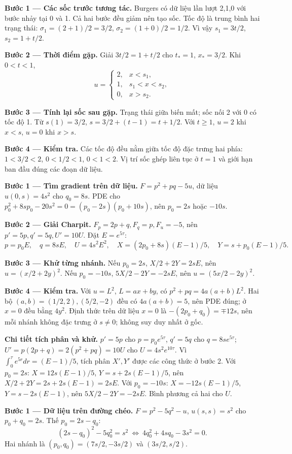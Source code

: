 \textbf{Bước 1 — Các sốc trước tương tác.} Burgers có dữ liệu lần lượt 2,1,0 với bước nhảy tại 0 và 1. Cả hai bước đều giảm nên tạo sốc. Tốc độ là trung bình hai trạng thái: $\sigma_1=(2+1)/2=3/2$, $\sigma_2=(1+0)/2=1/2$. Vì vậy $s_1=3t/2$, $s_2=1+t/2$.

\textbf{Bước 2 — Thời điểm gặp.} Giải $3t/2=1+t/2$ cho $t_*=1$, $x_*=3/2$. Khi $0<t<1$,
\[u=\begin{cases}2,&x<s_1,\\1,&s_1<x<s_2,\\0,&x>s_2.\end{cases}\]

\textbf{Bước 3 — Tính lại sốc sau gặp.} Trạng thái giữa biến mất; sốc nối 2 với 0 có tốc độ 1. Từ $s(1)=3/2$, $s=3/2+(t-1)=t+1/2$. Với $t\ge1$, $u=2$ khi $x<s$, $u=0$ khi $x>s$.

\textbf{Bước 4 — Kiểm tra.} Các tốc độ đều nằm giữa tốc độ đặc trưng hai phía: $1<3/2<2$, $0<1/2<1$, $0<1<2$. Vị trí sốc ghép liên tục ở $t=1$ và giới hạn ban đầu đúng các đoạn dữ liệu.

\textbf{Bước 1 — Tìm gradient trên dữ liệu.} $F=p^2+pq-5u$, dữ liệu $u(0,s)=4s^2$ cho $q_0=8s$. PDE cho $p_0^2+8sp_0-20s^2=0=(p_0-2s)(p_0+10s)$, nên $p_0=2s$ hoặc $-10s$.

\textbf{Bước 2 — Giải Charpit.} $F_p=2p+q,F_q=p,F_u=-5$, nên $p'=5p,q'=5q,U'=10U$. Đặt $E=e^{5\tau}$:
\[p=p_0E,\quad q=8sE,\quad U=4s^2E^2,\quad X=(2p_0+8s)(E-1)/5,\quad Y=s+p_0(E-1)/5.\]

\textbf{Bước 3 — Khử từng nhánh.} Nếu $p_0=2s$, $X/2+2Y=2sE$, nên $u=(x/2+2y)^2$. Nếu $p_0=-10s$, $5X/2-2Y=-2sE$, nên $u=(5x/2-2y)^2$.

\textbf{Bước 4 — Kiểm tra.} Với $u=L^2$, $L=ax+by$, có $p^2+pq=4a(a+b)L^2$. Hai bộ $(a,b)=(1/2,2),(5/2,-2)$ đều có $4a(a+b)=5$, nên PDE đúng; ở $x=0$ đều bằng $4y^2$. Định thức trên dữ liệu $x=0$ là $-(2p_0+q_0)=\mp12s$, nên mỗi nhánh không đặc trưng ở $s\ne0$; không suy duy nhất ở gốc.

\textbf{Chi tiết tích phân và khử.} $p'=5p$ cho $p=p_0e^{5\tau}$, $q'=5q$ cho $q=8se^{5\tau}$; $U'=p(2p+q)=2(p^2+pq)=10U$ cho $U=4s^2e^{10\tau}$. Vì $\int_0^\tau e^{5r}dr=(E-1)/5$, tích phân $X',Y'$ được các công thức ở bước 2. Với $p_0=2s$: $X=12s(E-1)/5$, $Y=s+2s(E-1)/5$, nên $X/2+2Y=2s+2s(E-1)=2sE$. Với $p_0=-10s$: $X=-12s(E-1)/5$, $Y=s-2s(E-1)$, nên $5X/2-2Y=-2sE$. Bình phương cả hai cho $U$.

\textbf{Bước 1 — Dữ liệu trên đường chéo.} $F=p^2-5q^2-u$, $u(s,s)=s^2$ cho $p_0+q_0=2s$. Thế $p_0=2s-q_0$:
\[(2s-q_0)^2-5q_0^2=s^2\ \Longleftrightarrow\ 4q_0^2+4sq_0-3s^2=0.\]
Hai nhánh là $(p_0,q_0)=(7s/2,-3s/2)$ và $(3s/2,s/2)$.

